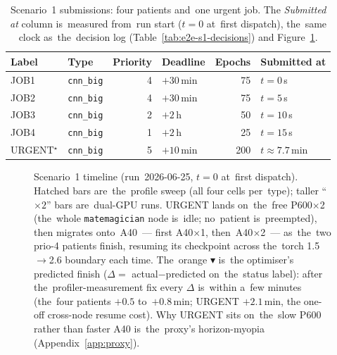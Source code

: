 \begin{table}[H]\centering\small
\begin{tabular}{l l r l r l}\toprule
Label & Type & Priority & Deadline & Epochs & Submitted at \\\midrule
JOB1 & \texttt{cnn\_big} & 4 & $+30$\,min & 75  & $t=0$\,s    \\
JOB2 & \texttt{cnn\_big} & 4 & $+30$\,min & 75  & $t=5$\,s    \\
JOB3 & \texttt{cnn\_big} & 2 & $+2$\,h    & 50  & $t=10$\,s   \\
JOB4 & \texttt{cnn\_big} & 1 & $+2$\,h    & 25  & $t=15$\,s   \\
URGENT$^{\star}$ & \texttt{cnn\_big} & 5 & $+10$\,min & 200 & $t{\approx}7.7$\,min \\\bottomrule
\end{tabular}
\caption{Scenario~1 submissions: four patients and~one urgent job.  The
\emph{Submitted at} column is~measured from~run start ($t{=}0$ at~first dispatch),
the~same clock as~the~decision log (Table~\ref{tab:e2e-s1-decisions}) and
Figure~\ref{fig:e2e-s1}.}\label{tab:e2e-s1-jobs}
\end{table}

\begin{figure}[H]\centering
\resizebox{\linewidth}{!}{}
\caption{Scenario~1 timeline (run~2026-06-25, $t{=}0$ at~first dispatch).
Hatched bars are~the~profile sweep (all four cells per~type); taller
``$\times2$'' bars are~dual-GPU runs.  URGENT lands on~the~free P600$\times$2
(the~whole \texttt{matemagician} node is~idle; no~patient is~preempted), then
migrates onto~A40~--- first A40$\times$1, then~A40$\times$2~--- as~the~two
prio-4 patients finish, resuming its checkpoint across the~torch
1.5$\to$2.6 boundary each time.  The~orange $\blacktriangledown$ is~the
optimiser's predicted finish ($\Delta=$ actual${-}$predicted on~the~status
label): after the~profiler-measurement fix every $\Delta$ is~within a~few
minutes (the~four patients $+0.5$ to~$+0.8$\,min; URGENT $+2.1$\,min, the
one-off cross-node resume cost).  Why URGENT sits on~the~slow P600 rather
than faster A40 is~the~proxy's horizon-myopia
(Appendix~\ref{app:proxy}).}\label{fig:e2e-s1}
\end{figure}

